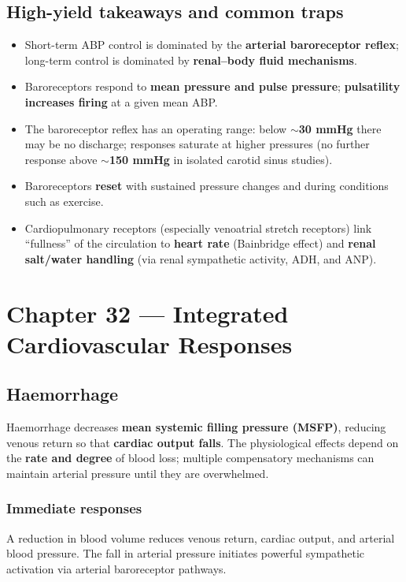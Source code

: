 \documentclass[11pt,a4paper]{article}
\begin{document}
\subsection{High-yield takeaways and common traps}
\begin{itemize}
\item Short-term ABP control is dominated by the \textbf{arterial baroreceptor reflex}; long-term control is dominated by \textbf{renal--body fluid mechanisms}.
\item Baroreceptors respond to \textbf{mean pressure and pulse pressure}; \textbf{pulsatility increases firing} at a given mean ABP.
\item The baroreceptor reflex has an operating range: below \textbf{$\sim$30 mmHg} there may be no discharge; responses saturate at higher pressures (no further response above \textbf{$\sim$150 mmHg} in isolated carotid sinus studies).
\item Baroreceptors \textbf{reset} with sustained pressure changes and during conditions such as exercise.
\item Cardiopulmonary receptors (especially venoatrial stretch receptors) link ``fullness'' of the circulation to \textbf{heart rate} (Bainbridge effect) and \textbf{renal salt/water handling} (via renal sympathetic activity, ADH, and ANP).
\end{itemize}


\section{Chapter 32 --- Integrated Cardiovascular Responses}

\subsection{Haemorrhage}
Haemorrhage decreases \textbf{mean systemic filling pressure (MSFP)}, reducing venous return so that \textbf{cardiac output falls}. The physiological effects depend on the \textbf{rate and degree} of blood loss; multiple compensatory mechanisms can maintain arterial pressure until they are overwhelmed.

\subsubsection{Immediate responses}
A reduction in blood volume reduces venous return, cardiac output, and arterial blood pressure. The fall in arterial pressure initiates powerful sympathetic activation via arterial baroreceptor pathways.
\end{document}
